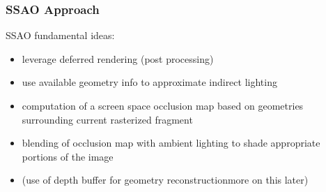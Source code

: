 \documentclass{beamer}
\newcommand{\redtext}[1]{\textcolor{myred}{#1}}
\begin{document}
%
%    

\begin{frame}
\frametitle{SSAO Approach}
SSAO fundamental ideas:
\begin{itemize}
    \item leverage deferred rendering (\redtext{post processing})
    \item use available geometry info to \redtext{approximate indirect lighting}
    \item computation of a \redtext{screen space occlusion map} based on geometries surrounding current rasterized fragment
    \item \redtext{blending} of occlusion map with ambient lighting to shade appropriate portions of the image
    \item (use of depth buffer for geometry reconstruction\textemdash{}more on this later)
\end{itemize}
\end{frame}
\end{document}
